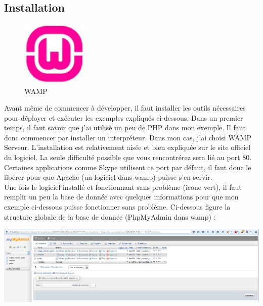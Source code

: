 \documentclass{article}
\begin{document}
\subsection{Installation}

\begin{figure}
  \vspace{-25pt}
  \begin{center}
    \includegraphics[width=0.28\textwidth]{p25}
  \end{center}
  \vspace{-20pt}
  \caption{WAMP}
  \vspace{-10pt}
\end{figure} 
Avant m\^eme de commencer \`a d\'evelopper, il faut installer les outils n\'ecessaires pour d\'eployer et ex\'ecuter les exemples expliqu\'es ci-dessous. Dans un premier temps, il faut savoir que j'ai utilis\'e un peu de PHP dans mon exemple. Il faut donc commencer par installer un interpr\'eteur. Dans mon cas, j'ai choisi WAMP Serveur. L'installation est relativement ais\'ee et bien expliqu\'ee sur le site officiel du logiciel. La seule difficult\'e possible que vous rencontr\'erez sera li\'e au port 80. Certaines applications comme Skype utilisent ce port par d\'efaut, il faut donc le lib\'erer pour que Apache (un logiciel dans wamp) puisse s'en servir. \\
Une fois le logiciel install\'e et fonctionnant sans probl\`eme (icone vert), il faut remplir un peu la base de donn\'ee avec quelques informations pour que mon exemple ci-dessous puisse fonctionner sans probl\`eme. Ci-dessous figure la structure globale de la base de donnée (PhpMyAdmin dans wamp) :
\begin{center}
\vspace{0.5cm}
\includegraphics[width=\textwidth]{p26}
\vspace{0.5cm}\\
\end{center}
\end{document}
